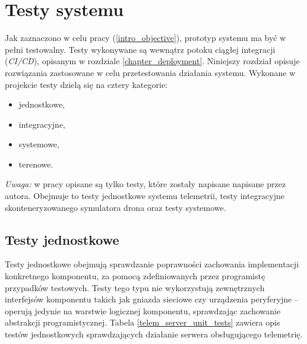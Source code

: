\chapter{Testy systemu} \label{chapter_tests}

Jak zaznaczono w celu pracy (\ref{intro_objective}), prototyp systemu
ma być w pełni testowalny. Testy wykonywane są wewnątrz potoku ciągłej integracji 
(\textit{CI/CD}), opisanym w rozdziale \ref{chapter_deployment}. Niniejszy rozdział opisuje
rozwiązania zastosowane w celu przetestowania działania systemu.
Wykonane w projekcie testy dzielą się na cztery kategorie:

\begin{itemize}
    \item jednostkowe,
    \item integracyjne,
    \item systemowe,
    \item terenowe.
\end{itemize}

\noindent
\textit{Uwaga:} w pracy opisane są tylko testy, które zostały
napisane napisane przez autora. Obejmuje to testy jednostkowe systemu telemetrii,
testy integracyjne skonteneryzowanego symulatora drona oraz testy systemowe.

\section{Testy jednostkowe}

Testy jednostkowe obejmują sprawdzanie poprawności zachowania implementacji 
konkretnego komponentu, za pomocą zdefiniowanych przez programistę
przypadków testowych. Testy tego typu nie wykorzystują zewnętrznych 
interfejsów komponentu takich jak gniazda sieciowe czy urządzenia peryferyjne --
operują jedynie na warstwie logicznej komponentu, sprawdzając zachowanie 
abstrakcji programistycznej.
Tabela \ref{telem_server_unit_tests} zawiera 
opis testów jednostkowych sprawdzających działanie serwera
obsługującego telemetrię.


